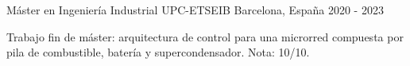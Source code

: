 \cventry
  {M\'aster en Ingenier\'ia Industrial}
  {UPC-ETSEIB}
  {Barcelona, Espa\~na}
  {2020 - 2023}
  {
    \begin{cvitems}
      \item {Trabajo fin de m\'aster: arquitectura de control para una microrred compuesta por pila de combustible, bater\'ia y supercondensador. Nota: 10/10.}
    \end{cvitems}
  }

